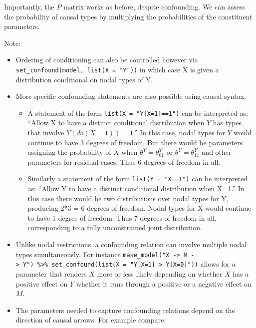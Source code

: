 \documentclass[
  12pt,
]{book}
\providecommand{\tightlist}{%
  \setlength{\itemsep}{0pt}\setlength{\parskip}{0pt}}
\begin{document}
Importantly, the \(P\) matrix works as before, despite confounding. We can assess the probability of causal types by multiplying the probabilities of the constituent parameters.

Note:

\begin{itemize}
\item
  Ordering of conditioning can also be controlled however via \texttt{set\_confound(model,\ list(X\ =\ "Y"))} in which case X is given a distribution conditional on nodal types of Y.
\item
  More specific confounding statements are also possible using causal syntax.

  \begin{itemize}
  \tightlist
  \item
    A statement of the form \texttt{list(X\ =\ "Y{[}X=1{]}==1")} can be interpreted as: ``Allow X to have a distinct conditional distribution when \(Y\) has types that involve \(Y(do(X=1))=1\).'' In this case, nodal types for \(Y\) would continue to have 3 degrees of freedom. But there would be parameters assigning the probability of \(X\) when \(\theta^Y = \theta^Y_{01}\) or \(\theta^Y = \theta^Y_{11}\) and other parameters for residual cases. Thus 6 degrees of freedom in all.
  \item
    Similarly a statement of the form \texttt{list(Y\ =\ "X==1")} can be interpreted as: ``Allow Y to have a distinct conditional distribution when X=1.'' In this case there would be two distributions over nodal types for Y, producing 2*3 = 6 degrees of freedom. Nodal types for X would continue to have 1 degree of freedom. Thus 7 degrees of freedom in all, corresponding to a fully unconstrained joint distribution.
  \end{itemize}
\item
  Unlike nodal restrictions, a confounding relation can involve multiple nodal types simultaneously. For instance \texttt{make\_model("X\ -\textgreater{}\ M\ -\textgreater{}\ Y")\ \%\textgreater{}\%\ set\_confound(list(X\ =\ "Y{[}X=1{]}\ \textgreater{}\ Y{[}X=0{]}"))} allows for a parameter that renders \(X\) more or less likely depending on whether \(X\) has a positive effect on \(Y\) whether it runs through a positive or a negative effect on \(M\).
\item
  The parameters needed to capture confounding relations depend on the direction of causal arrows. For example compare:


\end{itemize}
\end{document}

